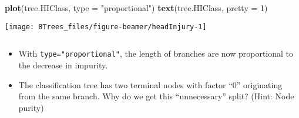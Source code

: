 \documentclass[10pt,ignorenonframetext,]{beamer}
\newenvironment{Shaded}{\begin{snugshade}}{\end{snugshade}}
\newcommand{\DataTypeTok}[1]{\textcolor[rgb]{0.13,0.29,0.53}{#1}}
\newcommand{\DecValTok}[1]{\textcolor[rgb]{0.00,0.00,0.81}{#1}}
\newcommand{\KeywordTok}[1]{\textcolor[rgb]{0.13,0.29,0.53}{\textbf{#1}}}
\newcommand{\NormalTok}[1]{#1}
\newcommand{\StringTok}[1]{\textcolor[rgb]{0.31,0.60,0.02}{#1}}
\begin{document}
\begin{frame}[fragile]

\scriptsize

\begin{Shaded}
\begin{Highlighting}[]
\KeywordTok{plot}\NormalTok{(tree.HIClass, }\DataTypeTok{type =} \StringTok{"proportional"}\NormalTok{)}
\KeywordTok{text}\NormalTok{(tree.HIClass, }\DataTypeTok{pretty =} \DecValTok{1}\NormalTok{)}
\end{Highlighting}
\end{Shaded}

\begin{center}\texttt{[image: 8Trees\_files/figure-beamer/headInjury-1]} \end{center}

\(~\)

\normalsize

\begin{itemize}
\item
  With \texttt{type="proportional"}, the length of branches are now
  proportional to the decrease in impurity.
\item
  The classification tree has two terminal nodes with factor ``0''
  originating from the same branch. Why do we get this ``unnecessary''
  split? (Hint: Node purity)
\end{itemize}

\end{frame}
\end{document}
